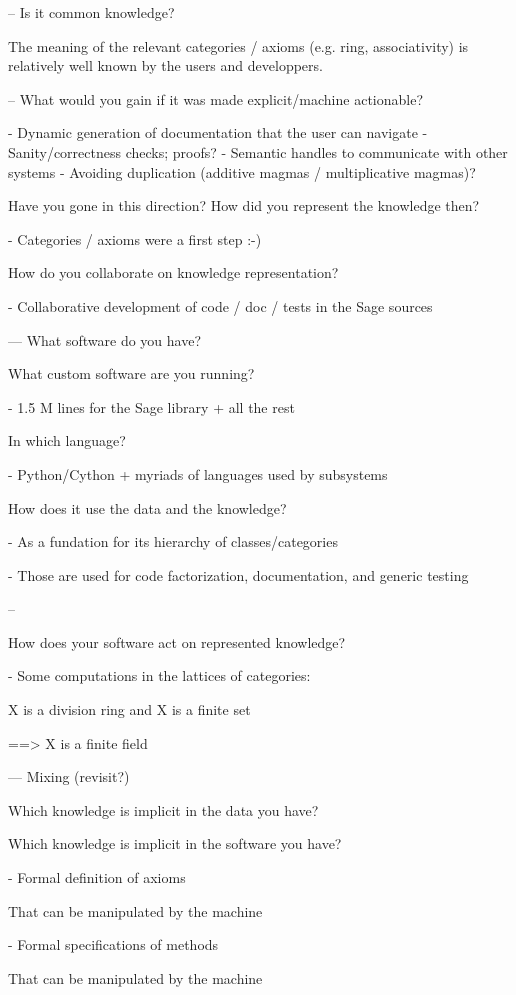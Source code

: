 \documentclass{deliverablereport}
\begin{document}
--
 Is it common knowledge?

The meaning of the relevant categories / axioms (e.g. ring,
associativity) is relatively well known by the users and developpers.

--
 What would you gain if it was made explicit/machine actionable?

- Dynamic generation of documentation that the user can navigate
- Sanity/correctness checks; proofs?
- Semantic handles to communicate with other systems
- Avoiding duplication (additive magmas / multiplicative magmas)?

 Have you gone in this direction? How did you represent the knowledge then?

- Categories / axioms were a first step :-)

 How do you collaborate on knowledge representation?

- Collaborative development of code / doc / tests in the Sage sources

---
 What software do you have?

 What custom software are you running?

- 1.5 M lines for the Sage library + all the rest

 In which language?

- Python/Cython + myriads of languages used by subsystems

 How does it use the data and the knowledge?

- As a fundation for its hierarchy of classes/categories

- Those are used for code factorization, documentation, and generic testing

--

 How does your software act on represented knowledge?

- Some computations in the lattices of categories:

  X is a division ring and X is a finite set

  ==> X is a finite field

---
 Mixing (revisit?)

 Which knowledge is implicit in the data you have?

 Which knowledge is implicit in the software you have?

- Formal definition of axioms

  That can be manipulated by the machine

- Formal specifications of methods

  That can be manipulated by the machine
\end{document}
